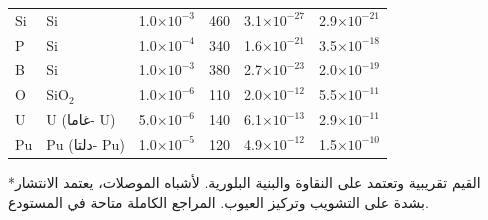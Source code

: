 \documentclass[11pt,a4paper]{article}
\begin{document}
\begin{otherlanguage}{arabic}
\begin{longtable}{p{1.2cm}p{1.2cm}p{2.0cm}p{2.5cm}p{2.5cm}p{2.5cm}}
			Si & Si & 1.0\(\times10^{-3}\) & 460 & 3.1\(\times10^{-27}\) & 2.9\(\times10^{-21}\) \\
			P & Si & 1.0\(\times10^{-4}\) & 340 & 1.6\(\times10^{-21}\) & 3.5\(\times10^{-18}\) \\
			B & Si & 1.0\(\times10^{-3}\) & 380 & 2.7\(\times10^{-23}\) & 2.0\(\times10^{-19}\) \\
			O & SiO\(_2\) & 1.0\(\times10^{-6}\) & 110 & 2.0\(\times10^{-12}\) & 5.5\(\times10^{-11}\) \\
			U & U (غاما- U) & 5.0\(\times10^{-6}\) & 140 & 6.1\(\times10^{-13}\) & 2.9\(\times10^{-11}\) \\
			Pu & Pu (دلتا- Pu) & 1.0\(\times10^{-5}\) & 120 & 4.9\(\times10^{-12}\) & 1.5\(\times10^{-10}\) \\
			\bottomrule
		\end{longtable}
		*القيم تقريبية وتعتمد على النقاوة والبنية البلورية. لأشباه الموصلات، يعتمد الانتشار بشدة على التشويب وتركيز العيوب. المراجع الكاملة متاحة في المستودع.
		
		
	\end{otherlanguage}
	
\end{document}
